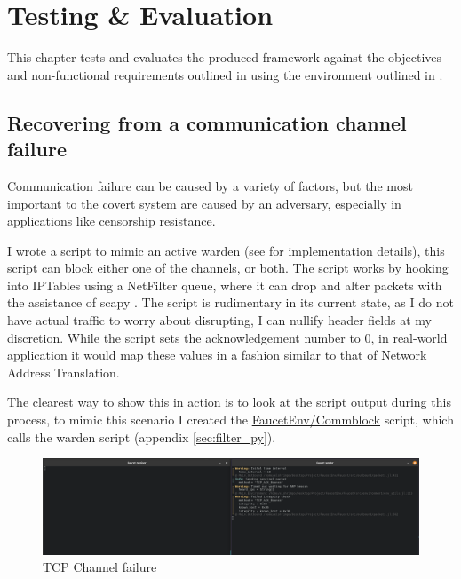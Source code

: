 \chapter{Testing \& Evaluation}

This chapter tests and evaluates the produced framework against the objectives and non-functional requirements outlined in  using the environment outlined in .

\section{Recovering from a communication channel failure}
\label{sec:failure_recovery}

Communication failure can be caused by a variety of factors, but the most important to the covert system are caused by an adversary, especially in applications like censorship resistance.

I wrote a script to mimic an active warden (see  for implementation details), this script can block either one of the channels, or both. The script works by hooking into IPTables using a NetFilter queue, where it can drop and alter packets with the assistance of scapy \citep{scapy}. The script is rudimentary in its current state, as I do not have actual traffic to worry about disrupting, I can nullify header fields at my discretion. While the script sets the acknowledgement number to 0, in real-world application it would map these values in a fashion similar to that of Network Address Translation.

The clearest way to show this in action is to look at the script output during this process, to mimic this scenario I created the \url{FaucetEnv/Commblock} script, which calls the warden script (appendix \ref{sec:filter_py}).

\begin{figure}[H]
    \centering
    \includegraphics[width=\textwidth]{fig/TCP_Failure.png}
    \caption{TCP Channel failure}
    \label{fig:TCP_Failure}
\end{figure}

